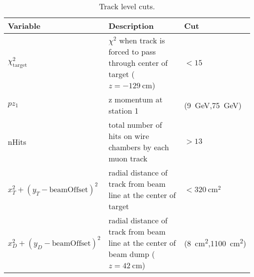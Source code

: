 \begin{table}[ht!]
	\centering
	\caption{Track level cuts.}
	\label{table:trackCut}
	\begin{tabular}{|m{4.5cm}|m{7cm}|m{3cm}|}
		\hline
		Variable                                                                                                                                                                                     & Description                                                                          & Cut                          \\ \hline
		$\chi^2_{\mathrm{target}}$                                                                                                                                                                   & $\chi^2$ when track is   forced to pass through center of target ($z=\SI{-129}{\cm}$) & $< 15$                       \\ \hline
		$pz_1$                                                                                                                                                                                       & z momentum at station 1                                                              & (\SI{9}{\GeV},\SI{75}{\GeV}) \\ \hline
		nHits                                                                                                                                                                                        & total number of hits on wire chambers by each   muon track                           & $> 13$                       \\ \hline
		$x_T^2 +(y_T - \mathrm{beamOffset})^2$                                                                                                                                                       & radial distance of track from   beam line at the center of target                    & $< \SI{320}{\cm\squared}$    \\ \hline
		$x_D^2 +(y_D - \mathrm{beamOffset})^2$                                                                                                                                                       &
		radial distance of track from   beam line at the center of beam dump ($z=\SI{42}{\cm}$)                                                                                                      &
		(\SI{8}{\cm\squared},\SI{1100}{\cm\squared})   \footnotemark[1]                                                                                                                                                                                                                                                    \\ \hline

\end{tabular}
\end{table}

